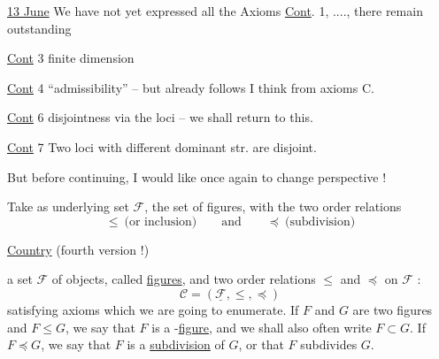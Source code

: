 
\uline{13 June} We have not yet expressed all the Axioms \uline{Cont}. 1, ...., there remain outstanding

\uline{Cont} 3 finite dimension

\uline{Cont} 4 ``admissibility'' -- but already follows I think from axioms C.

\uline{Cont} 6  disjointness via the loci -- we shall return to this.

\uline{Cont} 7 Two loci with different dominant str. are disjoint.

But before continuing, I would like once again to change perspective !

Take as underlying set $\mathcal F$, the set of figures, with the two order relations \[ \leq\ \text{(or inclusion)} \qquad \text{and}\qquad \preccurlyeq\ \text{(subdivision)} \]

\uline{Country} (fourth version !)

 a set $\mathcal F$ of objects, called \uline{figures}, and two order relations $\leq$ and $\preccurlyeq$ on $\mathcal F$ : \[ \mathcal C=(\underline{\mathcal F},\leq,\preccurlyeq) \] satisfying axioms\unsure{,|{}} which we are going to enumerate. If $F$ and $G$ are two figures and $F\leq G$, we say that $F$ is a -\uline{figure}, and we shall also often write $F\subset G$. If $F\preccurlyeq G$, we say that $F$ is a \uline{subdivision} of $G$, or that $F$ subdivides $G$.
